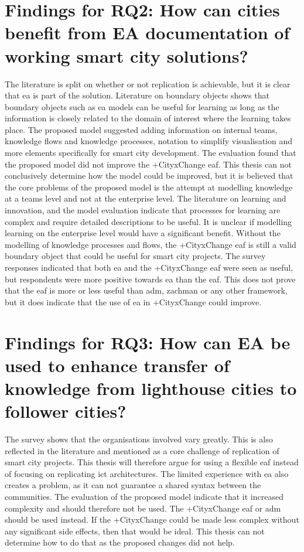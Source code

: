 \section{Findings for \textbf{RQ2:} How can cities benefit from EA documentation of working smart city solutions?}
The literature is split on whether or not replication is achievable, but it is clear that \gls{ea} is part of the solution. Literature on \glspl{boundary object} shows that \glspl{boundary object} such as \gls{ea} models can be useful for learning as long as the information is closely related to the domain of interest where the learning takes place. The proposed model suggested adding information on internal teams, knowledge flows and knowledge processes, notation to simplify visualisation and more elements specifically for smart city development. The evaluation found that the proposed model did not improve the +CityxChange \gls{eaf}. 
This thesis can not conclusively determine how the model could be improved, but it is believed that the core problems of the proposed model is the attempt at modelling knowledge at a teams level and not at the enterprise level. The literature on learning and innovation, and the model evaluation indicate that processes for learning are complex and require detailed descriptions to be useful. It is unclear if modelling learning on the enterprise level would have a significant benefit. 
Without the modelling of knowledge processes and flows, the +CityxChange \gls{eaf} is still a valid \gls{boundary object} that could be useful for smart city projects. The survey responses indicated that both \gls{ea} and the +CityxChange \gls{eaf} were seen as useful, but respondents were more positive towards \gls{ea} than the \gls{eaf}. This does not prove that the \gls{eaf} is more or less useful than \gls{adm}, zachman or any other framework, but it does indicate that the use of \gls{ea} in +CityxChange could improve. 


\section{Findings for \textbf{RQ3:} How can EA be used to enhance transfer of knowledge from lighthouse cities to follower cities?} The survey shows that the organisations involved vary greatly. This is also reflected in the literature and mentioned as a core challenge of replication of smart city projects. This thesis will therefore argue for using a flexible \gls{eaf} instead of focusing on replicating \gls{ict} architectures. 
The limited experience with \gls{ea} also creates a problem, as it can not guarantee a shared syntax between the communities. The evaluation of the proposed model indicate that it increased complexity and should therefore not be used. The +CityxChange \gls{eaf} or \gls{adm} should be used instead. If the +CityxChange could be made less complex without any significant side effects, then that would be ideal. This thesis can not determine how to do that as the proposed changes did not help.



